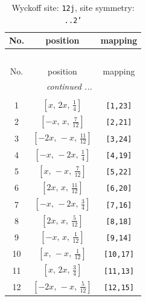 \documentclass[fleqn,8pt]{jsarticle}
\begin{document}
\begin{longtable}{ccc}
\caption{Wyckoff site: {\tt 12j}, site symmetry: {\tt ..2'}}
 \\
 \hline \hline
No. & position & mapping \\ \hline \endfirsthead

\multicolumn{2}{l}{\tablename\ \thetable{}} \\
 \hline \hline
No. & position & mapping \\ \hline \endhead

 \hline \hline
\multicolumn{2}{r}{\footnotesize\it continued ...} \\ \endfoot

 \hline \hline
\multicolumn{2}{r}{} \\ \endlastfoot

1 & $\left[ x,\, 2 x,\, \frac{1}{4} \right]$ & {\tt [1,23]} \\ \hline
2 & $\left[ - x,\, x,\, \frac{7}{12} \right]$ & {\tt [2,21]} \\ \hline
3 & $\left[ - 2 x,\, - x,\, \frac{11}{12} \right]$ & {\tt [3,24]} \\ \hline
4 & $\left[ - x,\, - 2 x,\, \frac{1}{4} \right]$ & {\tt [4,19]} \\ \hline
5 & $\left[ x,\, - x,\, \frac{7}{12} \right]$ & {\tt [5,22]} \\ \hline
6 & $\left[ 2 x,\, x,\, \frac{11}{12} \right]$ & {\tt [6,20]} \\ \hline
7 & $\left[ - x,\, - 2 x,\, \frac{3}{4} \right]$ & {\tt [7,16]} \\ \hline
8 & $\left[ 2 x,\, x,\, \frac{5}{12} \right]$ & {\tt [8,18]} \\ \hline
9 & $\left[ - x,\, x,\, \frac{1}{12} \right]$ & {\tt [9,14]} \\ \hline
10 & $\left[ x,\, - x,\, \frac{1}{12} \right]$ & {\tt [10,17]} \\ \hline
11 & $\left[ x,\, 2 x,\, \frac{3}{4} \right]$ & {\tt [11,13]} \\ \hline
12 & $\left[ - 2 x,\, - x,\, \frac{5}{12} \right]$ & {\tt [12,15]} \\
\end{longtable}
\renewcommand{\arraystretch}{1.2}
\end{document}
